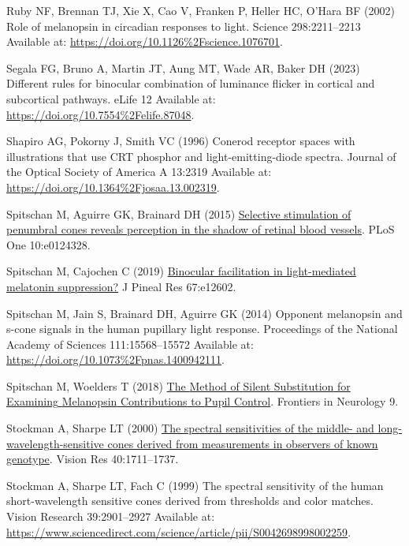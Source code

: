\documentclass[
]{article}
\newlength{\cslhangindent}
\newenvironment{CSLReferences}[2] %
 {\begin{list}{}{%
  \setlength{\itemindent}{0pt}
  \setlength{\leftmargin}{0pt}
  \setlength{\parsep}{0pt}
  \ifodd #1
   \setlength{\leftmargin}{\cslhangindent}
   \setlength{\itemindent}{-1\cslhangindent}
  \fi
  \setlength{\itemsep}{#2\baselineskip}}}
 {\end{list}}
\begin{document}
\begin{CSLReferences}{1}{1}
Ruby NF, Brennan TJ, Xie X, Cao V, Franken P, Heller HC, O'Hara BF (2002) Role of melanopsin in circadian responses to light. Science 298:2211--2213 Available at: \url{https://doi.org/10.1126\%2Fscience.1076701}.

Segala FG, Bruno A, Martin JT, Aung MT, Wade AR, Baker DH (2023) Different rules for binocular combination of luminance flicker in cortical and subcortical pathways. eLife 12 Available at: \url{https://doi.org/10.7554\%2Felife.87048}.

Shapiro AG, Pokorny J, Smith VC (1996) Cone{\textendash}rod receptor spaces with illustrations that use {CRT} phosphor and light-emitting-diode spectra. Journal of the Optical Society of America A 13:2319 Available at: \url{https://doi.org/10.1364\%2Fjosaa.13.002319}.

Spitschan M, Aguirre GK, Brainard DH (2015) \href{https://doi.org/10.1371/journal.pone.0124328}{Selective stimulation of penumbral cones reveals perception in the shadow of retinal blood vessels}. PLoS One 10:e0124328.

Spitschan M, Cajochen C (2019) \href{https://doi.org/10.1111/jpi.12602}{Binocular facilitation in light-mediated melatonin suppression?} J Pineal Res 67:e12602.

Spitschan M, Jain S, Brainard DH, Aguirre GK (2014) Opponent melanopsin and s-cone signals in the human pupillary light response. Proceedings of the National Academy of Sciences 111:15568--15572 Available at: \url{https://doi.org/10.1073\%2Fpnas.1400942111}.

Spitschan M, Woelders T (2018) \href{https://doi.org/10.3389/fneur.2018.00941}{The {Method} of {Silent} {Substitution} for {Examining} {Melanopsin} {Contributions} to {Pupil} {Control}}. Frontiers in Neurology 9.

Stockman A, Sharpe LT (2000) \href{https://doi.org/10.1016/s0042-6989(00)00021-3}{The spectral sensitivities of the middle- and long-wavelength-sensitive cones derived from measurements in observers of known genotype}. Vision Res 40:1711--1737.

Stockman A, Sharpe LT, Fach C (1999) The spectral sensitivity of the human short-wavelength sensitive cones derived from thresholds and color matches. Vision Research 39:2901--2927 Available at: \url{https://www.sciencedirect.com/science/article/pii/S0042698998002259}.


\end{CSLReferences}
\end{document}
